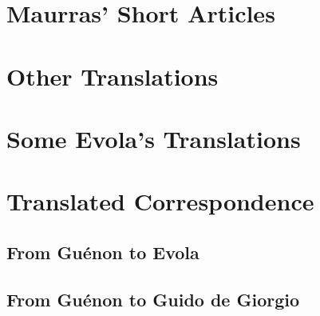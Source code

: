 \documentclass[a4paper,12pt,twoside]{book}
\begin{document}
\chapter{Maurras' Short Articles}



\chapter{Other Translations}




\chapter{Some Evola's Translations}


















\chapter{Translated Correspondence}


\section{From Guénon to Evola}








\section{From Guénon to Guido de Giorgio}







\end{document}
